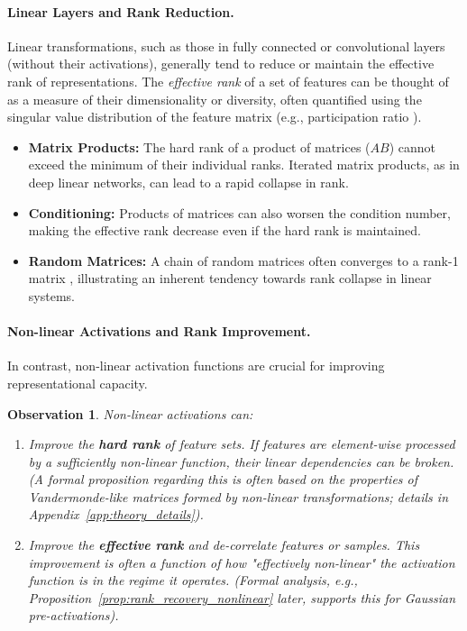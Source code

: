 \documentclass{article}
\newtheorem{observation}{Observation}[section]
\begin{document}
\paragraph{Linear Layers and Rank Reduction.}
Linear transformations, such as those in fully connected or convolutional layers (without their activations), generally tend to reduce or maintain the effective rank of representations. The \emph{effective rank} of a set of features can be thought of as a measure of their dimensionality or diversity, often quantified using the singular value distribution of the feature matrix (e.g., participation ratio \citep{roy2007effective}).
\begin{itemize}
    \item \textbf{Matrix Products:} The hard rank of a product of matrices ($AB$) cannot exceed the minimum of their individual ranks. Iterated matrix products, as in deep linear networks, can lead to a rapid collapse in rank.
    \item \textbf{Conditioning:} Products of matrices can also worsen the condition number, making the effective rank decrease even if the hard rank is maintained.
    \item \textbf{Random Matrices:} A chain of random matrices often converges to a rank-1 matrix \citep{o2006random}, illustrating an inherent tendency towards rank collapse in linear systems.
\end{itemize}

\paragraph{Non-linear Activations and Rank Improvement.}
In contrast, non-linear activation functions are crucial for improving representational capacity.
\begin{observation}
Non-linear activations can:
\begin{enumerate}
    \item Improve the \textbf{hard rank} of feature sets. If features are element-wise processed by a sufficiently non-linear function, their linear dependencies can be broken. (A formal proposition regarding this is often based on the properties of Vandermonde-like matrices formed by non-linear transformations; details in Appendix~\ref{app:theory_details}).
    \item Improve the \textbf{effective rank} and de-correlate features or samples. This improvement is often a function of how "effectively non-linear" the activation function is in the regime it operates. (Formal analysis, e.g., Proposition~\ref{prop:rank_recovery_nonlinear} later, supports this for Gaussian pre-activations).
\end{enumerate}
\end{observation}
\end{document}
